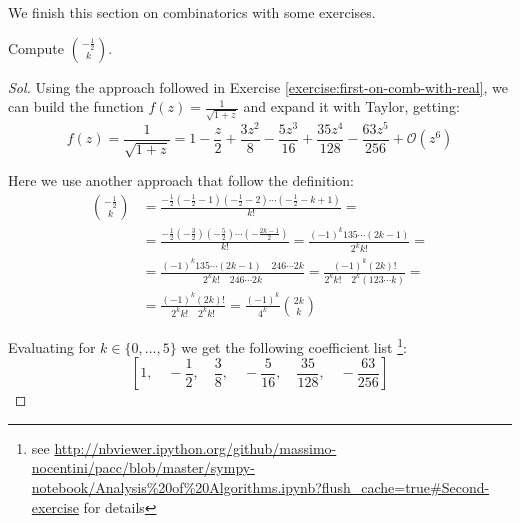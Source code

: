 We finish this section on combinatorics with some exercises.
\begin{exercise}
  Compute ${{ -\frac{1}{2} }\choose{k}} $.
\end{exercise}
\begin{proof}[Sol]
  Using the approach followed in Exercise
  \autoref{exercise:first-on-comb-with-real}, we can build the
  function $f(z) = \frac{1}{\sqrt{1+z}} $ and expand it with Taylor, getting:
  $$ f(z) = \frac{1}{\sqrt{1+z}}  = 1 - \frac{z}{2} + \frac{3 z^{2}}{8} - \frac{5 z^{3}}{16} + \frac{35 z^{4}}{128} - \frac{63 z^{5}}{256} + \mathcal{O}\left(z^{6}\right) $$

  Here we use another approach that follow the definition:
  \begin{displaymath}
    \begin{split}
      {{- \frac{1}{2} }\choose{k}} &= \frac{- \frac{1}{2}(- \frac{1}{2}
        -1)(- \frac{1}{2}-2)\cdots(- \frac{1}{2}-k +1) }{k!} = \\
      &= \frac{- \frac{1}{2}(- \frac{3}{2})(- \frac{5}{2})\cdots(-
        \frac{2k-1}{2}) }{k!} =
      \frac{(-1)^k 1 3 5\cdots (2k-1) }{2^k k!} =\\
      &=\frac{(-1)^k 1 3 5\cdots (2k-1) \quad 2 4 6\cdots 2k } {2^k
        k!\quad 2 4 6\cdots 2k } = \frac{(-1)^k (2k)! }
      {2^k k!\quad 2^k(1 2 3 \cdots k) } =\\
      &= \frac{(-1)^k (2k)! } {2^k k!\quad 2^kk! } =\frac{(-1)^k}{4^k }
      {{2k}\choose{k}}
    \end{split}
  \end{displaymath}

  Evaluating for $k \in \{0, \ldots, 5\}$ we get the following coefficient list
  \footnote{see \url{http://nbviewer.ipython.org/github/massimo-nocentini/pacc/blob/master/sympy-notebook/Analysis\%20of\%20Algorithms.ipynb?flush_cache=true\#Second-exercise} for details}:
  $$\left [ 1, \quad - \frac{1}{2}, \quad \frac{3}{8}, \quad - \frac{5}{16}, \quad \frac{35}{128}, \quad - \frac{63}{256}\right ]$$

\end{proof}

